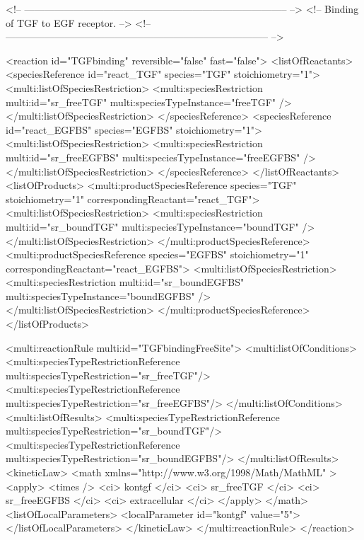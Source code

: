 \begin{example}
<!-- -------------------------------------------------------------------------------- -->
<!-- Binding of TGF to EGF receptor.                                                  -->
<!-- -------------------------------------------------------------------------------- -->

       <reaction id="TGFbinding" reversible="false" fast="false"> 
        <listOfReactants>
          <speciesReference id="react_TGF" species="TGF" stoichiometry="1">
            <multi:listOfSpeciesRestriction>
              <multi:speciesRestriction multi:id="sr_freeTGF" 
                                        multi:speciesTypeInstance="freeTGF" />
            </multi:listOfSpeciesRestriction>
          </speciesReference>
          <speciesReference id="react_EGFBS" species="EGFBS" stoichiometry="1">
            <multi:listOfSpeciesRestriction>
              <multi:speciesRestriction multi:id="sr_freeEGFBS" 
                                        multi:speciesTypeInstance="freeEGFBS" />
            </multi:listOfSpeciesRestriction>
          </speciesReference>
        </listOfReactants>
        <listOfProducts>
          <multi:productSpeciesReference species="TGF" stoichiometry="1"
                                   correspondingReactant="react_TGF">
            <multi:listOfSpeciesRestriction>
              <multi:speciesRestriction multi:id="sr_boundTGF" 
                                        multi:speciesTypeInstance="boundTGF" />
            </multi:listOfSpeciesRestriction>
          </multi:productSpeciesReference>
          <multi:productSpeciesReference species="EGFBS" stoichiometry="1"
                                   correspondingReactant="react_EGFBS">
            <multi:listOfSpeciesRestriction>
              <multi:speciesRestriction multi:id="sr_boundEGFBS" 
                                        multi:speciesTypeInstance="boundEGFBS" />
            </multi:listOfSpeciesRestriction>
          </multi:productSpeciesReference>
        </listOfProducts>

        <multi:reactionRule multi:id="TGFbindingFreeSite">
          <multi:listOfConditions>
            <multi:speciesTypeRestrictionReference multi:speciesTypeRestriction="sr_freeTGF"/>
            <multi:speciesTypeRestrictionReference multi:speciesTypeRestriction="sr_freeEGFBS"/>
          </multi:listOfConditions>
          <multi:listOfResults>
            <multi:speciesTypeRestrictionReference multi:speciesTypeRestriction="sr_boundTGF"/>
            <multi:speciesTypeRestrictionReference multi:speciesTypeRestriction="sr_boundEGFBS"/>
          </multi:listOfResults>
            <kineticLaw>
              <math xmlns="http://www.w3.org/1998/Math/MathML" >
                <apply>
                  <times />
                  <ci> kontgf </ci>
                  <ci> sr_freeTGF </ci>
                  <ci> sr_freeEGFBS </ci>
                  <ci> extracellular </ci>
                </apply>
              </math>
              <listOfLocalParameters>
                <localParameter id="kontgf" value="5">
              </listOfLocalParameters>
            </kineticLaw>
          </multi:reactionRule>
        </reaction>
\end{example}

